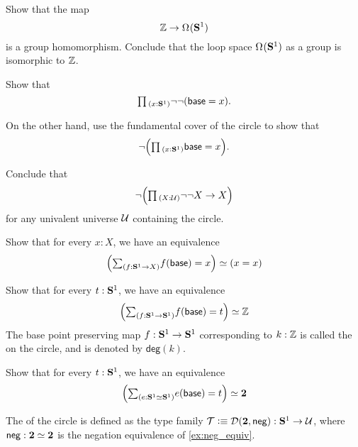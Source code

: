 \begin{exercises}
\exercise Show that the map
  \begin{equation*}
    {\mathbb{Z}}\to\Omega^{}(\mathbf{S}^{1})
  \end{equation*}
  is a group homomorphism. Conclude that the loop space $\Omega^{}(\mathbf{S}^{1})$ as a group is isomorphic to ${\mathbb{Z}}$.
  \exercise
  \begin{subexenum}
  \item Show that
    \begin{equation*}
      \prd{x:\sphere{1}}\neg\neg(\base=x).
    \end{equation*}
  \item On the other hand, use the fundamental cover of the circle to show that
    \begin{equation*}
      \neg\Big(\prd{x:\sphere{1}}\base=x\Big).
    \end{equation*}
  \item Conclude that
    \begin{equation*}
      \neg\Big(\prd{X:\UU} \neg\neg X\to X\Big)
    \end{equation*}
    for any univalent universe $\mathcal{U}$ containing the circle.
  \end{subexenum}
  \exercise \label{ex:circle_degk}
\begin{subexenum}
\item Show that for every $x:X$, we have an equivalence
\begin{equation*}
\eqv{\Big(\sm{f:\sphere{1}\to X}f(\base)= x \Big)}{(x=x)}
\end{equation*}
\item Show that for every $t:\mathbf{S}^{1}$, we have an equivalence
\begin{equation*}
\eqv{\Big(\sm{f:\sphere{1}\to \sphere{1}}f(\base)= t \Big)}{\Z}
\end{equation*}
The base point preserving map $f:\mathbf{S}^{1}\to\mathbf{S}^{1}$ corresponding to $k:{\mathbb{Z}}$ is called the  on the circle, and is denoted by $\mathsf{deg}(k)$.
\item Show that for every $t:\mathbf{S}^{1}$, we have an equivalence
\begin{equation*}
\eqv{\Big(\sm{e:\eqv{\sphere{1}}{\sphere{1}}}e(\base)= t \Big)}{\bool}
\end{equation*}
\end{subexenum}
\exercise \label{ex:circle_double_cover} The  of the circle is defined as the type family $\mathcal{T}\vcentcolon\equiv\mathcal{D}(\mathbf{2},\mathsf{neg}):\mathbf{S}^{1}\to\mathcal{U}$, where $\mathsf{neg}:\eqv{\bool}{\bool}$ is the negation equivalence of \cref{ex:neg_equiv}.

\end{exercises}
